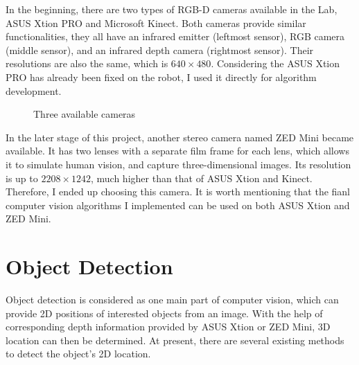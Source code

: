 In the beginning, there are two types of RGB-D cameras available in the Lab, ASUS Xtion PRO and Microsoft Kinect. Both cameras provide similar functionalities, they all have an infrared emitter (leftmost sensor), RGB camera (middle sensor), and an infrared depth camera (rightmost sensor). Their resolutions are also the same, which is $640 \times 480$. Considering the ASUS Xtion PRO has already been fixed on the robot, I used it directly for algorithm development.

\begin{figure}[H]
\centering
{}
\caption{Three available cameras}
\label{camera}
\end{figure}

In the later stage of this project, another stereo camera named ZED Mini became available. It has two lenses with a separate film frame for each lens, which allows it to simulate human vision, and capture three-dimensional images. Its resolution is up to $2208 \times 1242$, much higher than that of ASUS Xtion and Kinect. Therefore, I ended up choosing this camera. It is worth mentioning that the fianl computer vision algorithms I implemented can be used on both ASUS Xtion and ZED Mini.


\section{Object Detection} \label{od}
Object detection is considered as one main part of computer vision, which can provide 2D positions of interested objects from an image. With the help of corresponding depth information provided by ASUS Xtion or ZED Mini, 3D location can then be determined. At present, there are several existing methods to detect the object's 2D location.

